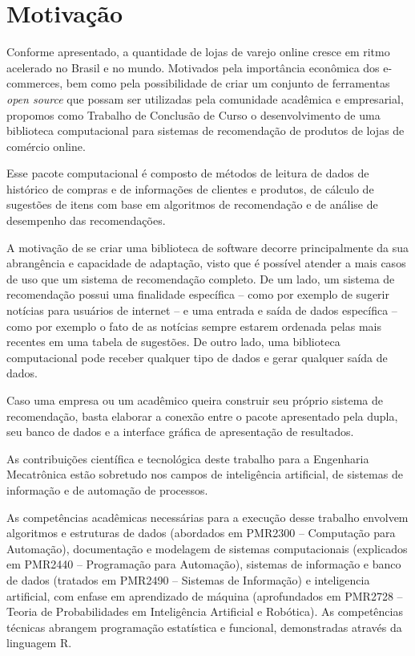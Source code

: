 \section{Motivação} %
\label{cha:motivacao}

Conforme apresentado, a quantidade de lojas de varejo online cresce em ritmo acelerado no Brasil e no mundo. Motivados pela importância econômica dos e-commerces, bem como pela possibilidade de criar um conjunto de ferramentas \textit{open source} que possam ser utilizadas pela comunidade acadêmica e empresarial, propomos como Trabalho de Conclusão de Curso o desenvolvimento de uma biblioteca computacional para sistemas de recomendação de produtos de lojas de comércio online.

Esse pacote computacional é composto de métodos de leitura de dados de histórico de compras e de informações de clientes e produtos, de cálculo de sugestões de itens com base em algoritmos de recomendação e de análise de desempenho das recomendações. 

A motivação de se criar uma biblioteca de software decorre principalmente da sua abrangência e capacidade de adaptação, visto que é possível atender a mais casos de uso que um sistema de recomendação completo. De um lado, um sistema de recomendação possui uma finalidade específica -- como por exemplo de sugerir notícias para usuários de internet -- e uma entrada e saída de dados específica -- como por exemplo o fato de as notícias sempre estarem ordenada pelas mais recentes em uma tabela de sugestões. De outro lado, uma biblioteca computacional pode receber qualquer tipo de dados e gerar qualquer saída de dados. 

Caso uma empresa ou um acadêmico queira construir seu próprio sistema de recomendação, basta elaborar a conexão entre o pacote apresentado pela dupla, seu banco de dados e a interface gráfica de apresentação de resultados.

As contribuições científica e tecnológica deste trabalho para a Engenharia Mecatrônica estão sobretudo nos campos de inteligência artificial, de sistemas de informação e de automação de processos.

As competências acadêmicas necessárias para a execução desse trabalho envolvem algoritmos e estruturas de dados (abordados em PMR2300 -- Computação para Automação), documentação e modelagem de sistemas computacionais (explicados em PMR2440 -- Programação para Automação), sistemas de informação e banco de dados (tratados em PMR2490 -- Sistemas de Informação) e inteligencia artificial, com enfase em aprendizado de máquina (aprofundados em PMR2728 -- Teoria de Probabilidades em Inteligência Artificial e Robótica). As competências técnicas abrangem programação estatística e funcional, demonstradas através da linguagem R.



